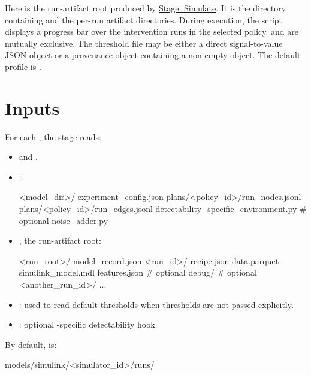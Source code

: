 \documentclass[11pt]{article}
\begin{document}
Here  is the run-artifact root produced by \hyperref[docstart:simulation_stage]{Stage: Simulate}.
It is the directory containing  and the per-run artifact directories.
During execution, the script displays a progress bar over the intervention runs in the selected policy.
 and  are mutually exclusive.
The threshold file may be either a direct signal-to-value JSON object or a provenance object containing a non-empty  object.
The default profile is .

\section*{Inputs}

For each \termSimulator, the stage reads:

\begin{itemize}
\item {}\hyperref[sec:candidate-generation-run-nodes]{} and \hyperref[sec:candidate-generation-run-edges]{}.
\item  {}:
\begin{DocCode}
<model_dir>/
    experiment_config.json
    plans/<policy_id>/run_nodes.jsonl
    plans/<policy_id>/run_edges.jsonl
    detectability_specific_environment.py # optional
    noise_adder.py
\end{DocCode}
\item {}, the run-artifact root:
\begin{DocCode}
<run_root>/
  model_record.json
  <run_id>/
    recipe.json
    data.parquet
    simulink_model.mdl
    features.json        # optional
    debug/               # optional
  <another_run_id>/
    ...
\end{DocCode}
\item {}: used to read default thresholds when thresholds are not passed explicitly.
\item {}: optional \termSimulator-specific detectability hook.
\end{itemize}

By default,  is:

\begin{DocCode}
models/simulink/<simulator_id>/runs/
\end{DocCode}
\end{document}
